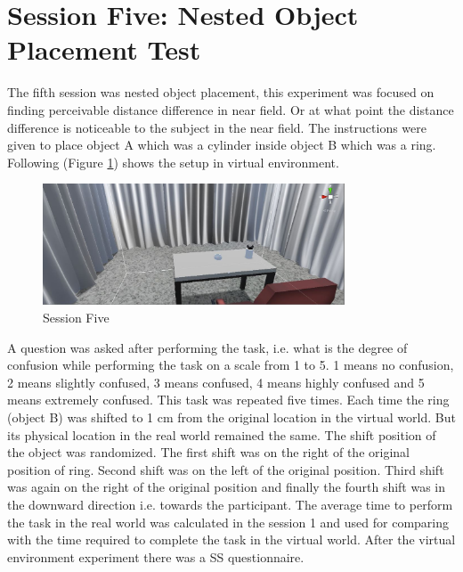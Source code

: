 
\section{Session Five: Nested Object Placement Test}
The fifth session was nested object placement, this experiment was focused on finding perceivable distance difference in near field. Or at what point the distance difference is noticeable to the subject in the near field. The instructions were given to place object A which was a cylinder inside object B which was a ring. Following (Figure \ref{fig:fig7}) shows the setup in virtual environment. 
\begin{figure}[h]
    \centering
    \includegraphics[width=0.8\textwidth]{./images/fig7.jpeg}
    \caption{Session Five}
    \label{fig:fig7}
\end{figure}
A question was asked after performing the task, i.e. what is the degree of confusion while performing the task on a scale from 1 to 5. 1 means no confusion, 2 means
slightly confused, 3 means confused, 4 means highly confused and 5 means extremely confused. This task was repeated five times. Each time the ring (object B) was shifted to 1 cm from the original location in the virtual world. But its physical location in the real world remained the same. The shift position of the object was randomized. The first shift was on the right of the original position of ring. Second shift was on the left of the original position. Third shift was again on the right of the original position and finally the fourth shift was in the downward direction i.e. towards the participant. The average time to perform the task in the real world was calculated in the session 1 and used for comparing with the time required to complete the task in the virtual world. After the virtual environment experiment there was a SS questionnaire. 

